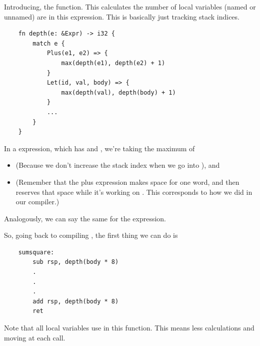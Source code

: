 \documentclass[letterpaper]{article}
\begin{document}
\bigskip 

Introducing, the  function. This calculates the number of local variables (named or unnamed) are in this expression. This is basically just tracking stack indices. 
\begin{verbatim}
    fn depth(e: &Expr) -> i32 {
        match e {
            Plus(e1, e2) => {
                max(depth(e1), depth(e2) + 1)
            }
            Let(id, val, body) => {
                max(depth(val), depth(body) + 1)
            }
            ...
        }
    }\end{verbatim}
In a  expression, which has  and , we're taking the maximum of 
\begin{itemize}
    \item {} (Because we don't increase the stack index when we go into ), and 
    \item {} (Remember that the plus expression makes space for one word, and then reserves that space while it's working on . This corresponds to how we did  in our compiler.)
\end{itemize}
Analogously, we can say the same for the  expression. 

\bigskip 

So, going back to compiling , the first thing we can do is 
\begin{verbatim}
    sumsquare:
        sub rsp, depth(body * 8)
        . 
        . 
        .
        add rsp, depth(body * 8)
        ret\end{verbatim}
Note that all local variables use \code{[rsp + \_\_\_]} in this function. This means less calculations and moving  at each call.
\end{document}
